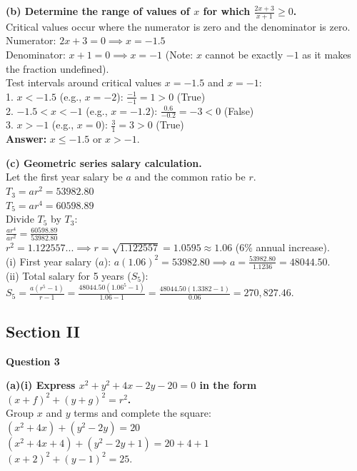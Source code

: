 \documentclass[12pt]{article}
\begin{document}
\textbf{(b) Determine the range of values of $x$ for which $\frac{2x+3}{x+1} \geq 0$.} \\
Critical values occur where the numerator is zero and the denominator is zero. \\
Numerator: $2x + 3 = 0 \implies x = -1.5$ \\
Denominator: $x + 1 = 0 \implies x = -1$ (Note: $x$ cannot be exactly $-1$ as it makes the fraction undefined). \\
Test intervals around critical values $x = -1.5$ and $x = -1$: \\
1. $x < -1.5$ (e.g., $x = -2$): $\frac{-1}{-1} = 1 > 0$ (True) \\
2. $-1.5 < x < -1$ (e.g., $x = -1.2$): $\frac{0.6}{-0.2} = -3 < 0$ (False) \\
3. $x > -1$ (e.g., $x = 0$): $\frac{3}{1} = 3 > 0$ (True) \\
\textbf{Answer:} $x \leq -1.5$ or $x > -1$.

\textbf{(c) Geometric series salary calculation.} \\
Let the first year salary be $a$ and the common ratio be $r$. \\
$T_3 = ar^2 = 53982.80$ \\
$T_5 = ar^4 = 60598.89$ \\
Divide $T_5$ by $T_3$: \\
$\frac{ar^4}{ar^2} = \frac{60598.89}{53982.80}$ \\
$r^2 = 1.122557... \implies r = \sqrt{1.122557} = 1.0595 \approx 1.06$ (6\% annual increase). \\
(i) First year salary ($a$): $a(1.06)^2 = 53982.80 \implies a = \frac{53982.80}{1.1236} = 48044.50$. \\
(ii) Total salary for 5 years ($S_5$): \\
$S_5 = \frac{a(r^5 - 1)}{r - 1} = \frac{48044.50(1.06^5 - 1)}{1.06 - 1} = \frac{48044.50(1.3382 - 1)}{0.06} = 270,827.46$.

\subsection*{Section II}

\textbf{Question 3}

\textbf{(a)(i) Express $x^2 + y^2 + 4x - 2y - 20 = 0$ in the form $(x+f)^2 + (y+g)^2 = r^2$.} \\
Group $x$ and $y$ terms and complete the square: \\
$(x^2 + 4x) + (y^2 - 2y) = 20$ \\
$(x^2 + 4x + 4) + (y^2 - 2y + 1) = 20 + 4 + 1$ \\
$(x + 2)^2 + (y - 1)^2 = 25$.
\end{document}
